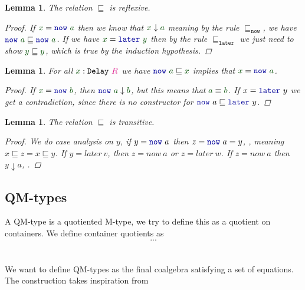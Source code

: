 \documentclass[twoside,11pt,openright]{report}
\theoremstyle{plain} %
\newtheorem{lem}[thm]{Lemma}
\theoremstyle{definition}
\theoremstyle{remark}
\newcommand*{\term}[1]{\textcolor{green!30!black}{#1}} %
\newcommand*{\type}[1]{\textcolor{magenta!90!black}{#1}}
\newcommand*{\function}[1]{\textcolor{blue!60!black}{\ensuremath{\mathtt{#1}}}}
\newcommand*{\typeformer}[1]{\ensuremath{\mathtt{#1}}}
\begin{document}
\begin{lem}
  The relation \(\sqsubseteq\) is reflexive.
  \begin{proof}
    If \(\term{x} = \function{now}~\term{a}\) then we know that \(\term{x} \downarrow \term{a}\) meaning by the rule \(\sqsubseteq_{\mathtt{now}}\), we have \(\function{now}~\term{a} \sqsubseteq \function{now}~\term{a}\). If we have \(\term{x} = \function{later}~\term{y}\) then by the rule \(\sqsubseteq_{\mathtt{later}}\) we just need to show \(\term{y} \sqsubseteq \term{y}\), which is true by the induction hypothesis.
  \end{proof}
\end{lem}

\begin{lem}
  For all \(\term{x} : \typeformer{Delay}~\type{R}\) we have \(\function{now}~\term{a} \sqsubseteq \term{x}\) implies that \(\term{x} = \function{now}~\term{a}\).
  \begin{proof}
    If \(\term{x} = \function{now}~\term{b}\), then \(\function{now}~\term{a} \downarrow \term{b}\), but this means that \(\term{a} \equiv \term{b}\). If  \(x = \function{later}~y\) we get a contradiction, since there is no constructor for \(\function{now}~a \sqsubseteq \function{later}~y\).
  \end{proof}
\end{lem}
\begin{lem}
  The relation \(\sqsubseteq\) is transitive.
  \begin{proof}
    We do case analysis on \(y\), if \(y = \function{now}~a\) then \(z = \function{now}~a = y\), , meaning \(x \sqsubseteq z = x \sqsubseteq y\). If \(y = later~v\), then \(z = now~a\) or \(z = later~w\). If \(z = now~a\) then \(y \downarrow a\), .
  \end{proof}
\end{lem}




\subsection{QM-types}
A QM-type is a quotiented M-type, we try to define this as a quotient on containers. We define container quotients as
\begin{equation}
  ...
\end{equation}
\\ \\
We want to define QM-types as the final coalgebra satisfying a set of equations. The construction takes inspiration from \cite{Infinitary-QIITs}
\end{document}
